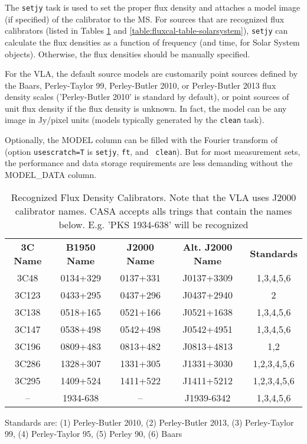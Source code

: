 The {\tt setjy} task is used to set the proper flux density and
attaches a model image (if specified) of the calibrator to the MS. For
sources that are recognized flux calibrators (listed in Tables
\ref{table:fluxcal-table} and \ref{table:fluxcal-table-solarsystem}),
{\tt setjy} can calculate the flux densities as a function of
frequency (and time, for Solar System objects).  Otherwise, the flux
densities should be manually specified.  

For the VLA, the default source models are customarily point sources
defined by the Baars, Perley-Taylor 99, Perley-Butler 2010, or
Perley-Butler 2013 flux density scales ('Perley-Butler 2010' is
standard by default), or point sources of unit flux density if the
flux density is unknown. In fact, the model can be any image in
Jy/pixel units (models typically generated by the {\tt clean} task).


Optionally, the MODEL column can be filled with the Fourier transform
of (option {\tt usescratch=T} is {\tt setjy}, {\tt ft}, and {\tt
  clean}). But for most measurement sets, the performance and data
storage requirements are less demanding without the MODEL\_DATA column.


\vspace{5mm}
\begin{table}[h!]
\caption{Recognized Flux Density Calibrators. Note that the VLA uses
J2000 calibrator names. CASA accepts alls trings that contain the
names below. E.g. 'PKS 1934-638' will be recognized
        {\label{table:fluxcal-table}}}
\begin{center}
\begin{tabular}{|ccccc|} \hline
 {\bf 3C Name}  & {\bf B1950 Name}& {\bf J2000 Name} & {\bf Alt. J2000
   Name} & {\bf Standards}\\
3C48  &  0134+329 &  0137+331 &  J0137+3309 & 1,3,4,5,6  \\
3C123 &  0433+295 &  0437+296 &  J0437+2940 &      2 \\
3C138 &  0518+165 &  0521+166 &  J0521+1638 &      1,3,4,5,6\\
3C147 &  0538+498 &  0542+498 &  J0542+4951 &      1,3,4,5,6\\
3C196 &  0809+483 &  0813+482 &  J0813+4813 &      1,2 \\
3C286 &  1328+307 &  1331+305 &  J1331+3030 &      1,2,3,4,5,6\\
3C295 &  1409+524 &  1411+522 &  J1411+5212 &      1,2,3,4,5,6\\
 --   &  1934-638 &    --     &  J1939-6342 &      1,3,4,5,6\\
\hline
\end{tabular}
\end{center}
Standards are: (1) Perley-Butler 2010, (2) Perley-Butler 2013, (3) Perley-Taylor 99, (4) Perley-Taylor 95, (5) Perley 90, (6) Baars 
\end{table}



